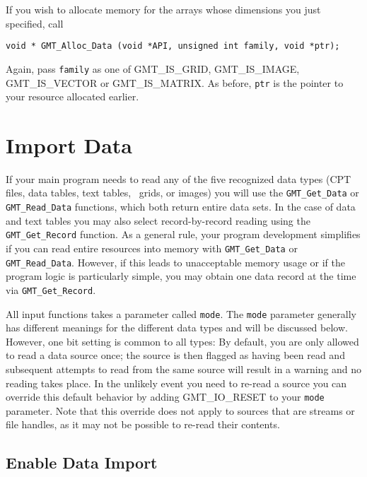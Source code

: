 \documentclass[11pt]{report}
\begin{document}
If you wish to allocate memory for the arrays whose dimensions you just specified, call


\begin{verbatim}
void * GMT_Alloc_Data (void *API, unsigned int family, void *ptr);
\end{verbatim}
Again, pass \texttt{family} as one of GMT\_IS\_GRID, GMT\_IS\_IMAGE, GMT\_IS\_VECTOR or GMT\_IS\_MATRIX.
As before, \texttt{ptr} is the pointer to your resource allocated earlier.

\section{Import Data}

If your main program needs to read any of the five recognized data types (CPT files, data tables, text tables, \GMT\ grids, or images)
you will use the \texttt{GMT\_Get\_Data} or \texttt{GMT\_Read\_Data} functions, which both return entire data sets.
In the case of data and text tables you may also select record-by-record reading using the \texttt{GMT\_Get\_Record} function.
As a general rule, your program development simplifies if you can read entire resources into memory with
\texttt{GMT\_Get\_Data} or \texttt{GMT\_Read\_Data}.  However, if this leads to unacceptable memory usage or if the program logic is particularly simple,
you may obtain one data record at the time via \texttt{GMT\_Get\_Record}.

All input functions takes a parameter called \texttt{mode}.  The \texttt{mode} parameter generally
has different meanings for the different data types and will be discussed below.
However, one bit setting is common to all types: By default, you are only allowed to read a
data source once; the source is then flagged as having been read and subsequent attempts to read
from the same source will result in a warning and no reading takes place.  In the unlikely event you need to re-read a
source you can override this default behavior by adding GMT\_IO\_RESET to your \texttt{mode} parameter.
Note that this override does not apply to sources that are streams or file handles, as it may not be
possible to re-read their contents.

\subsection{Enable Data Import}
\end{document}
